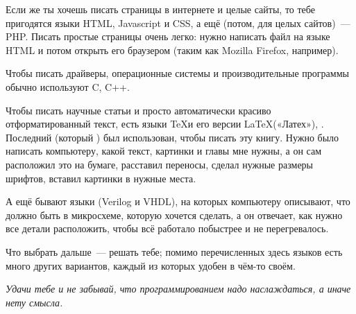%
%
%
%

Если же ты хочешь писать страницы в интернете и целые сайты, то тебе пригодятся языки HTML, Javascript и CSS, а ещё (потом, для целых сайтов) — PHP. Писать простые страницы очень легко: нужно написать файл на языке HTML и потом открыть его браузером (таким как Mozilla Firefox, например).

Чтобы писать драйверы, операционные системы и производительные программы обычно используют C, C++.

Чтобы писать научные статьи и просто автоматически красиво отформатированный текст, есть языки \TeX и его версии \LaTeX («Латех»), \XeLaTeX. Последний (который \XeLaTeX) был использован, чтобы писать эту книгу. Нужно было написать компьютеру, какой текст, картинки и главы мне нужны, а он сам расположил это на бумаге, расставил переносы, сделал нужные размеры шрифтов, вставил картинки в нужные места.

А ещё бывают языки (Verilog и VHDL), на которых компьютеру описывают, что должно быть в микросхеме, которую хочется сделать, а он отвечает, как нужно все детали расположить, чтобы всё работало побыстрее и не перегревалось.

Что выбрать дальше — решать тебе; помимо перечисленных здесь языков есть много других вариантов, каждый из которых удобен в чём-то своём.

\emph{Удачи тебе и не забывай, что программированием надо наслаждаться, а иначе нету смысла.}

\newpage